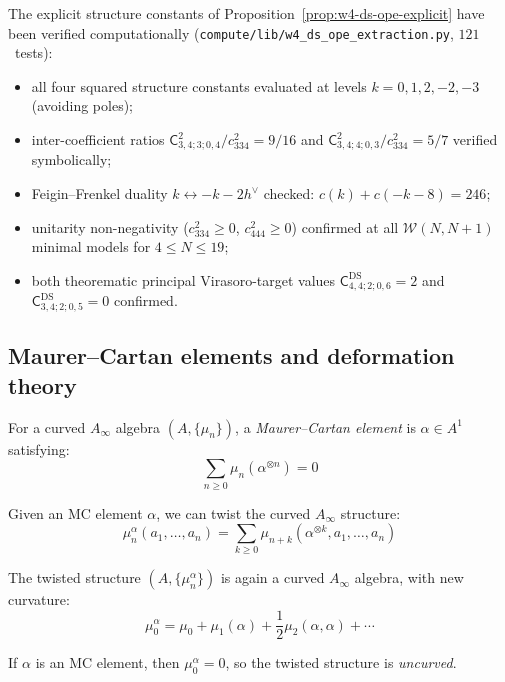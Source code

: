 \begin{computation}
\label{comp:w4-ds-ope-extraction}
The explicit structure constants of
Proposition~\ref{prop:w4-ds-ope-explicit} have been verified
computationally
(\texttt{compute/lib/w4\_ds\_ope\_extraction.py}, $121$~tests):
\begin{itemize}
\item all four squared structure constants evaluated at levels
  $k = 0, 1, 2, -2, -3$ (avoiding poles);
\item inter-coefficient ratios
  $\mathsf{C}_{3,4;3;0,4}^2/c_{334}^2 = 9/16$ and
  $\mathsf{C}_{3,4;4;0,3}^2/c_{334}^2 = 5/7$ verified symbolically;
\item Feigin--Frenkel duality $k \leftrightarrow -k-2h^\vee$
  checked: $c(k) + c(-k-8) = 246$;
\item unitarity non-negativity ($c_{334}^2 \geq 0$, $c_{444}^2 \geq 0$)
  confirmed at all $\mathcal{W}(N, N{+}1)$ minimal models
  for $4 \leq N \leq 19$;
\item both theorematic principal Virasoro-target values
  $\mathsf{C}^{\mathrm{DS}}_{4,4;2;0,6} = 2$ and
  $\mathsf{C}^{\mathrm{DS}}_{3,4;2;0,5} = 0$ confirmed.
\end{itemize}
\end{computation}

\subsection{Maurer--Cartan elements and deformation theory}
\label{sec:maurer-cartan-curved}

\begin{definition}
\label{def:mc-element-curved}
For a curved $A_\infty$ algebra $(A, \{\mu_n\})$, a \emph{Maurer--Cartan element} is $\alpha 
\in A^1$ satisfying:
\begin{equation}
\sum_{n \geq 0} \mu_n(\alpha^{\otimes n}) = 0
\end{equation}
\end{definition}

\begin{theorem}
\label{thm:twisting-mc}
Given an MC element $\alpha$, we can twist the curved $A_\infty$ structure:
\begin{equation}
\mu_n^\alpha(a_1, \ldots, a_n) = \sum_{k \geq 0} \mu_{n+k}(\alpha^{\otimes k}, 
a_1, \ldots, a_n)
\end{equation}

The twisted structure $(A, \{\mu_n^\alpha\})$ is again a curved $A_\infty$ algebra, with new 
curvature:
\begin{equation}
\mu_0^\alpha = \mu_0 + \mu_1(\alpha) + \frac{1}{2}\mu_2(\alpha, \alpha) + \cdots
\end{equation}

If $\alpha$ is an MC element, then $\mu_0^\alpha = 0$, so the twisted structure is 
\emph{uncurved}.
\end{theorem}

